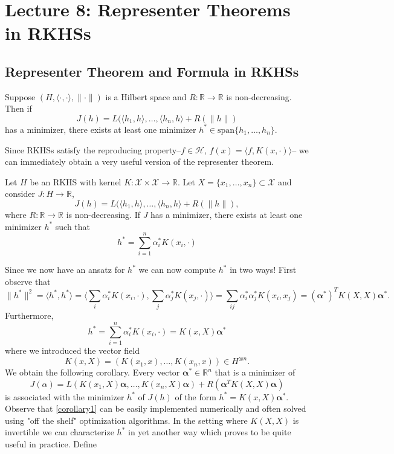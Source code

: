 \documentclass[11pt]{book} %
\begin{document}
\chapter{Lecture 8: Representer Theorems in RKHSs}
\section{Representer Theorem and Formula in RKHSs}
\begin{theorem}
    Suppose $(H, \langle \cdot, \cdot \rangle, \lVert \cdot \rVert)$ is a Hilbert space and $R: \mathbb{R} \to \mathbb{R}$ is non-decreasing. Then if
    \[
    J(h) = L(\langle h_1, h\rangle, \hdots, \langle h_n, h\rangle + R(\lVert h \rVert)
    \]
    has a minimizer, there exists at least one minimizer $h^* \in \text{span} \{h_1, \hdots, h_n \}$.
\end{theorem}
Since RKHSs satisfy the reproducing property--$f \in \mathcal{H}$, $f(x) = \langle f, K(x,\cdot)\rangle$-- we can immediately obtain a very useful version of the representer theorem.
\begin{theorem}
    Let $H$ be an RKHS with kernel $K: \mathcal{X} \times \mathcal{X} \to \mathbb{R}$. Let $X = \{x_1,\hdots,x_n\} \subset \mathcal{X}$ and consider $J: H \to \mathbb{R}$,
    \[
    J(h) = L(\langle h_1, h\rangle, \hdots, \langle h_n, h\rangle + R(\lVert h \rVert),
    \]
    where $R: \mathbb{R} \to \mathbb{R}$ is non-decreasing. If $J$ has a minimizer, there exists at least one minimizer $h^*$ such that 
    \[
    h^* = \sum_{i=1}^n \alpha_i^* K(x_i,\cdot)
    \]
\end{theorem}
Since we now have an ansatz for $h^*$ we can now compute $h^*$ in two ways! First observe that 
    \[
    \| h^*\|^2 = \langle h^*, h^* \rangle =
    \langle \sum_i \alpha_i^* K(x_i,\cdot), \sum_j \alpha_j^* K(x_j,\cdot) \rangle =
    \sum_{ij} \alpha_i^* \alpha_j^* K(x_i,x_j) = (\mathbf{\alpha}^*)^T K(X,X) \mathbf{\alpha}^*.
    \]
Furthermore,
    \[
    h^* = \sum_{i=1}^n \alpha_i^* K(x_i,\cdot) = K(x,X) \mathbf{\alpha}^*
    \]
where we introduced the vector field
\[
K(x,X) = (K(x_1,x),\hdots,K(x_n,x)) \in H^{\otimes n}.
\]
We obtain the following corollary. Every vector $\mathbf{\alpha}^* \in \mathbb{R}^n$ that is a minimizer of 
\begin{equation}\label{corollary1}
J(\alpha) = L(K(x_1,X)\mathbf{\alpha},\hdots, K(x_n,X)\mathbf{\alpha}) + R(\mathbf{\alpha}^T K(X,X) \mathbf{\alpha})
\end{equation}
is associated with the minimizer $h^*$ of $J(h)$ of the form $h^*=K(x,X) \mathbf{\alpha}^*$. Observe that \ref{corollary1} can be easily implemented numerically and often solved using "off the shelf" optimization algorithms. In the setting where $K(X,X)$ is invertible we can characterize $h^*$ in yet another way which proves to be quite useful in practice. Define
\end{document}
